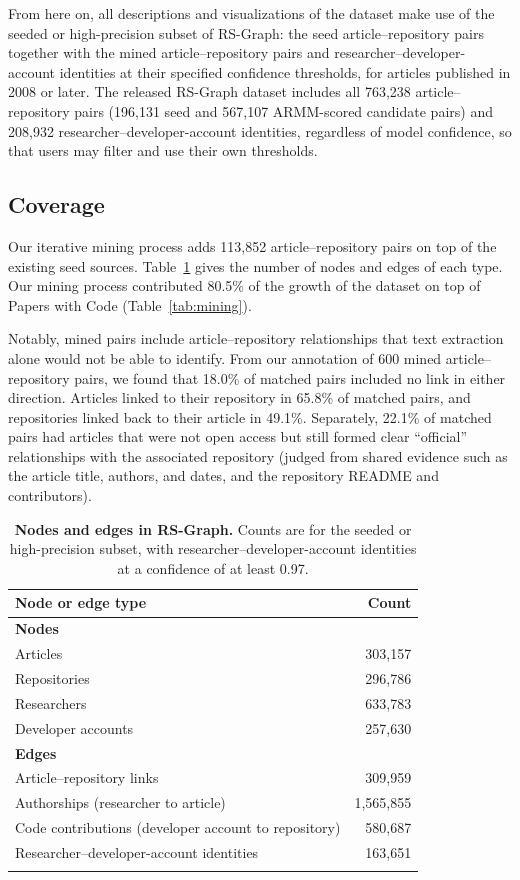 \documentclass[pdflatex,sn-nature]{sn-jnl}%
\begin{document}
From here on, all descriptions and visualizations of the dataset make use of the seeded or high-precision subset of RS-Graph: the seed article--repository pairs together with the mined article--repository pairs and researcher--developer-account identities at their specified confidence thresholds, for articles published in 2008 or later. The released RS-Graph dataset includes all 763,238 article--repository pairs (196,131 seed and 567,107 ARMM-scored candidate pairs) and 208,932 researcher--developer-account identities, regardless of model confidence, so that users may filter and use their own thresholds.

\subsection{Coverage}\label{subsec:coverage}

Our iterative mining process adds 113,852 article--repository pairs on top of the existing seed sources. Table~\ref{tab:nodes} gives the number of nodes and edges of each type. Our mining process contributed 80.5\% of the growth of the dataset on top of Papers with Code (Table~\ref{tab:mining}).

Notably, mined pairs include article--repository relationships that text extraction alone would not be able to identify. From our annotation of 600 mined article--repository pairs, we found that 18.0\% of matched pairs included no link in either direction. Articles linked to their repository in 65.8\% of matched pairs, and repositories linked back to their article in 49.1\%. Separately, 22.1\% of matched pairs had articles that were not open access but still formed clear ``official'' relationships with the associated repository (judged from shared evidence such as the article title, authors, and dates, and the repository README and contributors).

\begin{table}[ht]
\caption{\textbf{Nodes and edges in RS-Graph.} Counts are for the seeded or high-precision subset, with researcher--developer-account identities at a confidence of at least 0.97.}\label{tab:nodes}
\begin{tabular}{@{}lr@{}}
\toprule
Node or edge type & Count \\
\midrule
\textbf{Nodes} &  \\
\quad Articles & 303,157 \\
\quad Repositories & 296,786 \\
\quad Researchers & 633,783 \\
\quad Developer accounts & 257,630 \\
\textbf{Edges} &  \\
\quad Article--repository links & 309,959 \\
\quad Authorships (researcher to article) & 1,565,855 \\
\quad Code contributions (developer account to repository) & 580,687 \\
\quad Researcher--developer-account identities & 163,651 \\
\botrule
\end{tabular}
\end{table}
\end{document}
